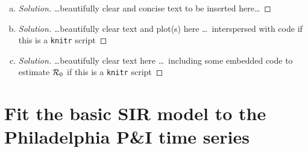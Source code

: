 \documentclass[12pt]{article}
\begin{document}
\begin{enumerate}[(a)]

\item \EstimateRna

 {\color{blue} \begin{proof}[Solution]
 {\color{magenta}\dots beautifully clear and concise text to be inserted here\dots}
 \end{proof}
 }

\item \EstimateRnb

  {\color{blue} \begin{proof}[Solution]
  {\color{magenta}\dots beautifully clear text and plot(s) here \dots\ interspersed with \Rlogo code if this is a \texttt{knitr} script}
  \end{proof}
  }
  
\item \EstimateRnc

  {\color{blue} \begin{proof}[Solution]
  {\color{magenta}\dots beautifully clear text here \dots\ including some embedded \Rlogo code to estimate ${\cal R}_0$ if this is a \texttt{knitr} script}
  \end{proof}
  }

\end{enumerate}

\section{Fit the basic SIR model to the Philadelphia P\&I time series}
\end{document}
